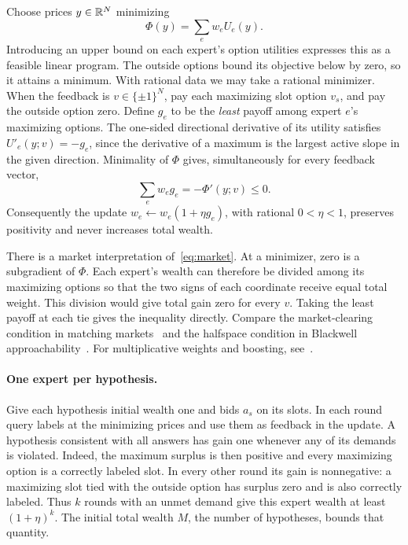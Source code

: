 Choose prices \(y\in\mathbb R^N\) minimizing
\[
        \Phi(y)=\sum_e w_e U_e(y) .
\]
Introducing an upper bound on each expert's option utilities expresses
this as a feasible linear program. The outside options bound its
objective below by zero, so it attains a minimum. With rational data
we may take a rational minimizer. When the feedback is
\(v\in\{\pm1\}^N\), pay each maximizing slot option \(v_s\), and pay
the outside option zero. Define \(g_e\) to be the \emph{least} payoff
among expert \(e\)'s maximizing options. The one-sided directional
derivative of its utility satisfies \(U'_e(y;v)=-g_e\), since the derivative of a maximum
is the largest active slope in the given direction. Minimality of
\(\Phi\) gives, simultaneously for every feedback vector,
\begin{equation}\label{eq:market}
         \sum_e w_e g_e=-\Phi'(y;v)\le0 .
\end{equation}
Consequently the update \(w_e\gets w_e(1+\eta g_e)\), with rational
\(0<\eta<1\), preserves positivity and never increases total wealth.

There is a market interpretation of~\eqref{eq:market}. At a minimizer,
zero is a subgradient of \(\Phi\). Each expert's wealth can therefore
be divided among its maximizing options so that the two signs of each
coordinate receive equal total weight. This division would give total
gain zero for every \(v\). Taking the least payoff at each tie gives
the inequality directly. Compare the market-clearing condition in
matching markets~\cite[Chapter~10]{EK} and the halfspace condition
in Blackwell approachability~\cite{Black}. For multiplicative weights
and boosting, see~\cite{Litt,FS,AHK}.

\paragraph{One expert per hypothesis.}
Give each hypothesis initial wealth one and bids \(a_s\) on its slots.
In each round query labels at the minimizing prices and use them as
feedback in the update. A hypothesis consistent with all answers has
gain one whenever any of its demands is violated. Indeed, the
maximum surplus is then positive and every maximizing option is a
correctly labeled slot. In every other round its gain is nonnegative:
a maximizing slot tied with the outside option has surplus zero
and is also correctly labeled. Thus \(k\) rounds with an unmet demand
give this expert wealth at least \((1+\eta)^k\). The initial total
wealth \(M\), the number of hypotheses, bounds that quantity.

